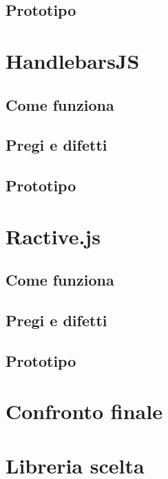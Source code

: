\subsection{Prototipo}


\FloatBarrier
\section{HandlebarsJS}

\subsection{Come funziona}

\subsection{Pregi e difetti}

\subsection{Prototipo}


\FloatBarrier
\section{Ractive.js}

\subsection{Come funziona}

\subsection{Pregi e difetti}

\subsection{Prototipo}


\clearpage
\section{Confronto finale}

\FloatBarrier
\section{Libreria scelta}

